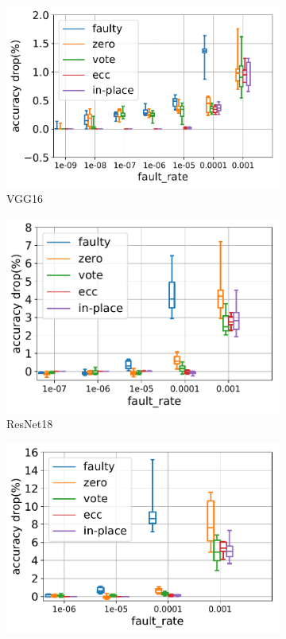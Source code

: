 \documentclass{article}
\begin{document}
\begin{figure}
	\centering
	\begin{subfigure}{.3\textwidth}
		\includegraphics[width=\textwidth]{NeuRIPS2019/images/protection/vgg16_int8_accuracy_drop.pdf}
		\caption{VGG16}
	\end{subfigure}
	\begin{subfigure}{.3\textwidth}
		\includegraphics[width=\textwidth]{NeuRIPS2019/images/protection/resnet18_int8_accuracy_drop.pdf}
		\caption{ResNet18}
	\end{subfigure}
	\begin{subfigure}{.3\textwidth}
		\includegraphics[width=\textwidth]{NeuRIPS2019/images/protection/squeezenet_int8_accuracy_drop.pdf}

\end{subfigure}
\end{figure}
\end{document}
